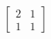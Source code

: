 \documentclass[preview]{standalone}
\begin{document}
\begin{align*}
\begin{bmatrix} 2 & 1 \\ 1 & 1 \end{bmatrix}
\end{align*}
\end{document}
